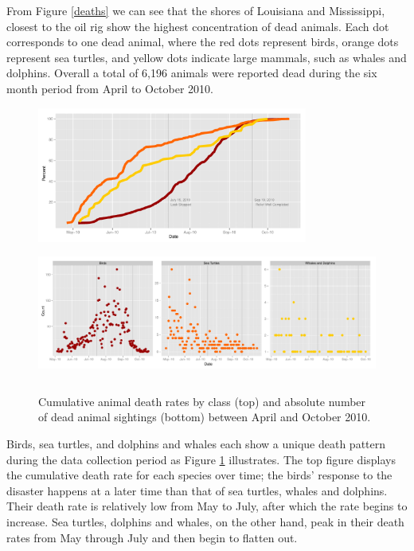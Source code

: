 \documentclass[authoryear,12pt]{elsarticle}
\begin{document}
{From Figure \ref{deaths} we can see that} the shores of Louisiana and Mississippi, closest to the oil rig show the highest concentration of dead animals. Each  {dot} corresponds to one dead  {animal, where} the red dots represent birds, orange dots  {represent} sea turtles, and yellow dots indicate large mammals, such as whales and dolphins. Overall a total of 6,196 animals were reported dead during  {the} six month period  {from April to October 2010}.

	\begin{figure}[htbp] %
   \centering
   \includegraphics[height=1.75in]{death-rates.pdf} 
    \includegraphics[height=1.75in]{daily-death-counts.pdf}
   \caption{Cumulative animal death rates by class  (top) and absolute number of dead animal sightings (bottom) between April and October 2010.\newline}
   \label{death rates}
\end{figure}


Birds, sea turtles, and dolphins and whales  {each show a} unique death pattern during the data collection period as Figure \ref{death rates} illustrates. The  {top} figure  {displays the} cumulative death rate for each species over time; the {birds' response} to the disaster  happens at a {later} time than that of sea turtles, whales and dolphins.  {Their death rate is relatively low} from May to July, after which the rate beg{ins} to increase. Sea turtles, dolphins and whales, on the other hand, {peak in their} death rates from May  {through} July and  {then} begin to flatten out. \\
\end{document}

